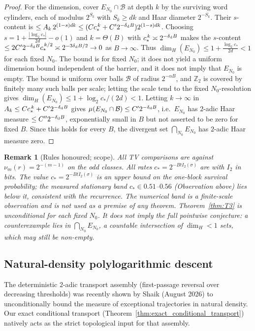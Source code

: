 \documentclass[12pt,a4paper]{article}
\newtheorem{remark}[theorem]{Remark}
\begin{document}
\begin{proof}
For the dimension, cover $E_{N_0}\cap\mathcal B$ at depth $k$ by the surviving
word cylinders, each of modulus $2^{S_k}$ with $S_k\ge dk$ and Haar diameter
$2^{-S_k}$. Their $s$-content is
$\le A_k\,2^{(1-s)dk}\le(Cc_*^{\,k}+C'2^{-\delta_{\rm d}B})2^{(1-s)dk}$.
Choosing $s=1+\frac{|\log_2 c_*|}{2d}-o(1)$ and $k=\Theta(B)$ with $c_*^{\,k}\asymp2^{-\delta_{\rm d}B}$ makes the $s$-content $\le2C'2^{-\delta_{\rm d}B}c_*^{\,k/2}\asymp2^{-3\delta_{\rm d}B/2}\to0$ as $B\to\infty$. Thus $\dim_H(E_{N_0})\le1+\frac{\log_2 c_*}{2d}<1$ for each fixed $N_0$. The bound is for fixed $N_0$; it does not yield a uniform dimension bound independent of the barrier, and it does not imply that $E_{N_0}$ is empty.
The bound is uniform over balls $\mathcal B$ of radius $2^{-\alpha B}$, and
$\mathbb{Z}_2$ is covered by finitely many such balls per scale; letting the scale tend
to the fixed $N_0$-resolution gives $\dim_H(E_{N_0})\le1+\log_2 c_*/(2d)<1$.
Letting $k\to\infty$ in $A_k\le Cc_*^{\,k}+C'2^{-\delta_{\rm d}B}$ gives
$\mu(E_{N_0}\cap\mathcal B)\le C'2^{-\delta_{\rm d}B}$, i.e.\ $E_{N_0}$ has
$2$-adic Haar measure $\le C''2^{-\delta_{\rm d}B}$, exponentially small in $B$
but not asserted to be zero for fixed $B$. Since this holds for every $B$,
the divergent set $\bigcap_{N_0}E_{N_0}$ has $2$-adic Haar measure zero.
\end{proof}

\begin{remark}[Rules honoured; scope]
All TV comparisons are against $\nu_m(r)=2^{-(m-1)}$ on the odd
classes. All rates $c_*=2^{-BtI_2(\sigma)}$ are with $I_2$ in bits. The value $c_*=2^{-BtI_2(\sigma)}$ is an \emph{upper bound} on the one-block
survival probability; the measured stationary band $c_*\in0.51$--$0.56$
(Observation above) lies below it, consistent with the recurrence. The numerical
band is a finite-scale observation and is not used as a premise of any theorem. Theorem~\ref{thm:T3} is unconditional for each \emph{fixed} $N_0$. It does not imply the full pointwise conjecture: a counterexample lies in $\bigcap_{N_0}E_{N_0}$, a countable intersection of $\dim_H<1$ sets, which may still be non-empty.
\end{remark}

\subsection{Natural-density polylogarithmic descent}

The deterministic $2$-adic transport assembly (first-passage reversal over decreasing thresholds) was recently shown by Shaik (August 2026) to unconditionally bound the measure of exceptional trajectories in natural density. Our exact conditional transport (Theorem~\ref{thm:exact_conditional_transport}) natively acts as the strict topological input for that assembly.
\end{document}
